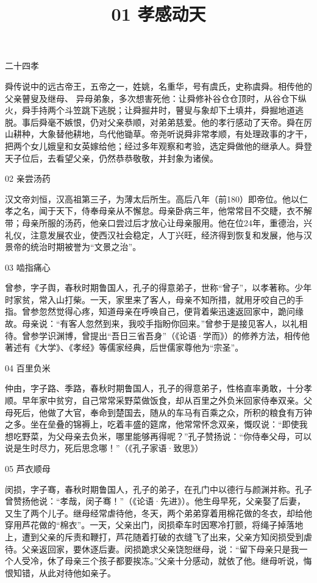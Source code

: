 \documentclass[12pt,a4paper]{article}
\newcommand{\chuhao}{\fontsize{42.2pt}{\baselineskip}\selectfont}
\begin{document}
\pagestyle{yang}
{\color{red}\chuhao 二十四孝}

\title{\color{blue} 01 孝感动天}

\lettrine[lhang=1, nindent=0pt,lines=2]{舜}{}传说中的远古帝王，五帝之一，姓姚，名重华，号有虞氏，史称虞舜。相传他的父亲瞽叟及继母、
异母弟象，多次想害死他：让舜修补谷仓仓顶时，从谷仓下纵火，舜手持两个斗笠跳下逃脱；让舜掘井时，瞽叟与象却下土填井，舜掘地道逃脱。事后舜毫不嫉恨，仍对父亲恭顺，对弟弟慈爱。他的孝行感动了天帝。舜在厉山耕种，大象替他耕地，鸟代他锄草。帝尧听说舜非常孝顺，有处理政事的才干，把两个女儿娥皇和女英嫁给他；经过多年观察和考验，选定舜做他的继承人。舜登天子位后，去看望父亲，仍然恭恭敬敬，并封象为诸侯。

02 亲尝汤药

\lettrine[lines=2]{汉}{}文帝刘恒，汉高祖第三子，为薄太后所生。高后八年（前180）即帝位。他以仁孝之名，闻于天下，侍奉母亲从不懈怠。母亲卧病三年，他常常目不交睫，衣不解带；母亲所服的汤药，他亲口尝过后才放心让母亲服用。他在位24年，重德治，兴礼仪，注意发展农业，使西汉社会稳定，人丁兴旺，经济得到恢复和发展，他与汉景帝的统治时期被誉为“文景之治”。

03 啮指痛心

\lettrine[lines=1]{曾}{}参，字子舆，春秋时期鲁国人，孔子的得意弟子，世称“曾子”，以孝著称。少年时家贫，常入山打柴。一天，家里来了客人，母亲不知所措，就用牙咬自己的手指。曾参忽然觉得心疼，知道母亲在呼唤自己，便背着柴迅速返回家中，跪问缘故。母亲说：“有客人忽然到来，我咬手指盼你回来。”曾参于是接见客人，以礼相待。曾参学识渊博，曾提出“吾日三省吾身”（《论语·学而》）的修养方法，相传他著述有《大学》、《孝经》等儒家经典，后世儒家尊他为“宗圣”。

04 百里负米

仲由，字子路、季路，春秋时期鲁国人，孔子的得意弟子，性格直率勇敢，十分孝顺。早年家中贫穷，自己常常采野菜做饭食，却从百里之外负米回家侍奉双亲。父母死后，他做了大官，奉命到楚国去，随从的车马有百乘之众，所积的粮食有万钟之多。坐在垒叠的锦褥上，吃着丰盛的筵席，他常常怀念双亲，慨叹说：“即使我想吃野菜，为父母亲去负米，哪里能够再得呢？”孔子赞扬说：“你侍奉父母，可以说是生时尽力，死后思念哪！”（《孔子家语·致思》）

05 芦衣顺母

闵损，字子骞，春秋时期鲁国人，孔子的弟子，在孔门中以德行与颜渊并称。孔子曾赞扬他说：“孝哉，闵子骞！”（《论语·先进》）。他生母早死，父亲娶了后妻，又生了两个儿子。继母经常虐待他，冬天，两个弟弟穿着用棉花做的冬衣，却给他穿用芦花做的“棉衣”。一天，父亲出门，闵损牵车时因寒冷打颤，将绳子掉落地上，遭到父亲的斥责和鞭打，芦花随着打破的衣缝飞了出来，父亲方知闵损受到虐待。父亲返回家，要休逐后妻。闵损跪求父亲饶恕继母，说：“留下母亲只是我一个人受冷，休了母亲三个孩子都要挨冻。”父亲十分感动，就依了他。继母听说，悔恨知错，从此对待他如亲子。
\end{document}
